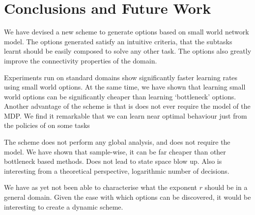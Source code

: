 \section{Conclusions and Future Work}
\label{sec:conclusions}

We have devised a new scheme to generate options based on small world
network model. The options generated satisfy an intuitive criteria, that
the subtasks learnt should be easily composed to solve any other task.
The options also greatly improve the connectivity properties of the
domain.

Experiments run on standard domains show significantly faster learning
rates using small world options. At the same time, we have shown that
learning small world options can be significantly cheaper than learning
`bottleneck' options. Another advantage of the scheme is that is does
not ever require the model of the MDP. We find it remarkable that we can
learn near optimal behaviour just from the policies of on some tasks


The scheme does not perform any global analysis, and does not require
the model. We have shown that sample-wise, it can be far cheaper than
other bottleneck based methods. Does not lead to state space blow up.
Also is interesting from a theoretical perspective, logarithmic number
of decisions.

We have as yet not been able to characterise what the exponent $r$
should be in a general domain. Given the ease with which options can be
discovered, it would be interesting to create a dynamic scheme.

